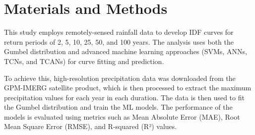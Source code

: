 \section{Materials and Methods}
This study employs remotely-sensed rainfall data to develop IDF curves for return periods of 2, 5, 10, 25, 50, and 100 years. The analysis uses both the Gumbel distribution and advanced machine learning approaches (SVMs, ANNs, TCNs, and TCANs) for curve fitting and prediction.

To achieve this, high-resolution precipitation data was downloaded from the GPM-IMERG satellite product, which is then processed to extract the maximum precipitation values for each year in each duration. The data is then used to fit the Gumbel distribution and train the ML models. The performance of the models is evaluated using metrics such as Mean Absolute Error (MAE), Root Mean Square Error (RMSE), and R-squared (R²) values.



